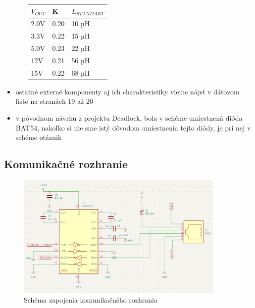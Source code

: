 \begin{itemize}
\begin{itemize}
    \begin{longtable}[]{@{}lll@{}}
    \toprule\noalign{}
    $V_{OUT}$ & K & $L_{STANDART}$ \\
    \midrule\noalign{}
    \endhead
    \bottomrule\noalign{}
    \endlastfoot
    2.0V & 0.20 & 10 µH \\
    3.3V & 0.22 & 15 µH \\
    5.0V & 0.23 & 22 µH \\
    12V & 0.21 & 56 µH \\
    15V & 0.22 & 68 µH \\
    \end{longtable}
  \end{itemize}
\item
  ostatné externé komponenty aj ich charakteristiky vieme nájsť v
  dátovom liste na stranách 19 až 20
  \item 
  v pôvodnom návrhu z projektu Deadlock, bola v schéme umiestnená dióda BAT54, nakoľko si nie sme istý dôvodom umiestnenia tejto diódy, je pri nej v schéme otáznik 
\end{itemize}

\subsection*{Komunikačné rozhranie}

\begin{figure}[!h]
    \centerline{\includegraphics[width=0.9\textwidth]{rs-232_schematic.png}}
    \caption{Schéma zapojenia komunikačného rozhrania}
    \label{obr:shc1}
\end{figure}

